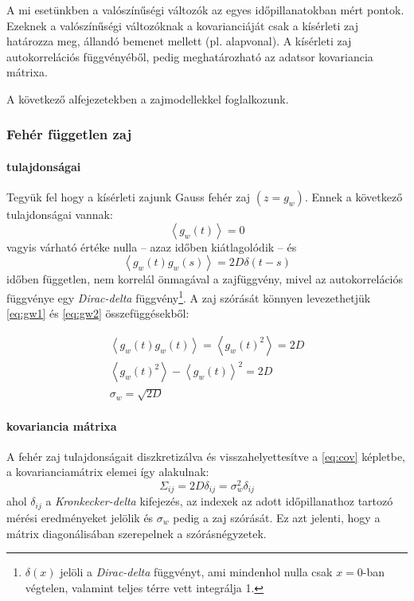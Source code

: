 A mi esetünkben a valószínűségi változók az egyes időpillanatokban mért pontok. Ezeknek a valószínűségi változóknak a kovarianciáját csak a kísérleti zaj határozza meg, állandó bemenet mellett (pl. alapvonal). A kísérleti zaj autokorrelációs függvényéből, pedig meghatározható az adatsor kovariancia mátrixa. 

A következő alfejezetekben a zajmodellekkel foglalkozunk. 

\subsubsection{Fehér független zaj}
\paragraph{tulajdonságai}
Tegyük fel hogy a kísérleti zajunk Gauss fehér zaj $(z = g_w)$. Ennek a következő tulajdonságai vannak:
\begin{equation}\label{eq:gw1}
\left<g_w(t)\right> = 0
\end{equation}
vagyis várható értéke nulla -- azaz időben kiátlagolódik -- és
\begin{equation}\label{eq:gw2}
\left<g_w(t)g_w(s)\right> = 2D\delta(t-s)
\end{equation}
időben független, nem korrelál önmagával a zajfüggvény, mivel az autokorrelációs függvénye egy \textit{Dirac-delta} függvény\footnote{ $\delta(x)$ jelöli a \textit{Dirac-delta} függvényt, ami mindenhol nulla csak $x=0$-ban végtelen, valamint teljes térre vett integrálja 1.}. A zaj szórását könnyen levezethetjük \ref{eq:gw1} és \ref{eq:gw2} összefüggésekből:

\begin{gather}
	\left<g_w(t)g_w(t)\right> = \left<g_w(t)^2\right> = 2D\\
	\left<g_w(t)^2\right> - \left<g_w(t)\right>^2 = 2D \\
	\sigma_w = \sqrt{2D}
\end{gather}

\paragraph{kovariancia mátrixa}
A fehér zaj tulajdonságait diszkretizálva és visszahelyettesítve a \ref{eq:cov} képletbe, a kovarianciamátrix elemei így alakulnak:
\begin{equation}
\Sigma_{ij} = 2D \delta_{ij} = \sigma_w^2 \delta_{ij}
\end{equation}
ahol $\delta_{ij}$ a \textit{Kronkecker-delta} kifejezés, az indexek az adott időpillanathoz tartozó mérési eredményeket jelölik és $\sigma_w$ pedig a zaj szórását. Ez azt jelenti, hogy a mátrix diagonálisában szerepelnek a szórásnégyzetek.

